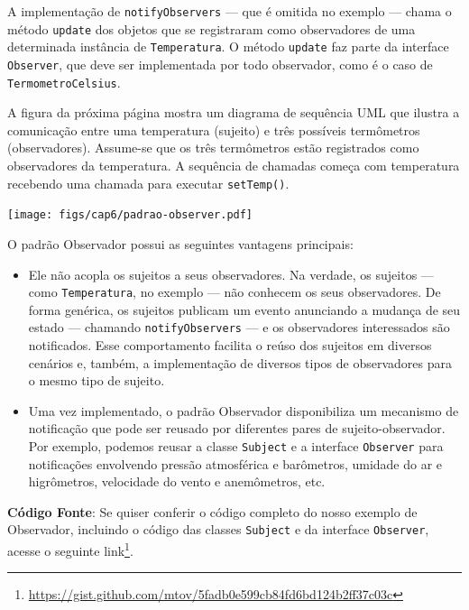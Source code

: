 \documentclass[
  11pt,
  twoside]{book}
\newcommand{\passthrough}[1]{#1}
\DeclareRobustCommand{\href}[2]{#2\footnote{\url{#1}}}
\let\origfigure\figure
\let\endorigfigure\endfigure
\renewenvironment{figure}[1][2] {
    \expandafter\origfigure\expandafter[!h]
} {
    \endorigfigure
}
\begin{document}
A implementação de \passthrough{\lstinline!notifyObservers!} --- que é
omitida no exemplo --- chama o método \passthrough{\lstinline!update!}
dos objetos que se registraram como observadores de uma determinada
instância de \passthrough{\lstinline!Temperatura!}. O método
\passthrough{\lstinline!update!} faz parte da interface
\passthrough{\lstinline!Observer!}, que deve ser implementada por todo
observador, como é o caso de
\passthrough{\lstinline!TermometroCelsius!}.

A figura da próxima página mostra um diagrama de sequência UML que
ilustra a comunicação entre uma temperatura (sujeito) e três possíveis
termômetros (observadores). Assume-se que os três termômetros estão
registrados como observadores da temperatura. A sequência de chamadas
começa com temperatura recebendo uma chamada para executar
\passthrough{\lstinline!setTemp()!}.

\begin{figure}
\centering
\texttt{[image: figs/cap6/padrao-observer.pdf]}
\caption{Padrão de projeto Observador}
\end{figure}

O padrão Observador possui as seguintes vantagens principais:

\begin{itemize}
\item
  Ele não acopla os sujeitos a seus observadores. Na verdade, os
  sujeitos --- como \passthrough{\lstinline!Temperatura!}, no exemplo
  --- não conhecem os seus observadores. De forma genérica, os sujeitos
  publicam um evento anunciando a mudança de seu estado --- chamando
  \passthrough{\lstinline!notifyObservers!} --- e os observadores
  interessados são notificados. Esse comportamento facilita o reúso dos
  sujeitos em diversos cenários e, também, a implementação de diversos
  tipos de observadores para o mesmo tipo de sujeito.
\item
  Uma vez implementado, o padrão Observador disponibiliza um mecanismo
  de notificação que pode ser reusado por diferentes pares de
  sujeito-observador. Por exemplo, podemos reusar a classe
  \passthrough{\lstinline!Subject!} e a interface
  \passthrough{\lstinline!Observer!} para notificações envolvendo
  pressão atmosférica e barômetros, umidade do ar e higrômetros,
  velocidade do vento e anemômetros, etc.
\end{itemize}

\textbf{Código Fonte}: Se quiser conferir o código completo do nosso
exemplo de Observador, incluindo o código das classes
\passthrough{\lstinline!Subject!} e da interface
\passthrough{\lstinline!Observer!}, acesse o seguinte
\href{https://gist.github.com/mtov/5fadb0e599cb84fd6bd124b2ff37c03c}{link}.
\end{document}
